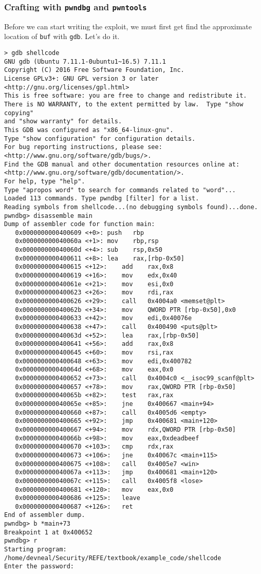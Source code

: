 \subsubsection{Crafting with \texttt{pwndbg} and \texttt{pwntools}}
Before we can start writing the exploit, we must first get find the approximate
location of \texttt{buf} with \texttt{gdb}. Let's do it.

\begin{lstlisting}
> gdb shellcode
GNU gdb (Ubuntu 7.11.1-0ubuntu1~16.5) 7.11.1
Copyright (C) 2016 Free Software Foundation, Inc.
License GPLv3+: GNU GPL version 3 or later <http://gnu.org/licenses/gpl.html>
This is free software: you are free to change and redistribute it.
There is NO WARRANTY, to the extent permitted by law.  Type "show copying"
and "show warranty" for details.
This GDB was configured as "x86_64-linux-gnu".
Type "show configuration" for configuration details.
For bug reporting instructions, please see:
<http://www.gnu.org/software/gdb/bugs/>.
Find the GDB manual and other documentation resources online at:
<http://www.gnu.org/software/gdb/documentation/>.
For help, type "help".
Type "apropos word" to search for commands related to "word"...
Loaded 113 commands. Type pwndbg [filter] for a list.
Reading symbols from shellcode...(no debugging symbols found)...done.
pwndbg> disassemble main
Dump of assembler code for function main:
   0x0000000000400609 <+0>:	push   rbp
   0x000000000040060a <+1>:	mov    rbp,rsp
   0x000000000040060d <+4>:	sub    rsp,0x50
   0x0000000000400611 <+8>:	lea    rax,[rbp-0x50]
   0x0000000000400615 <+12>:	add    rax,0x8
   0x0000000000400619 <+16>:	mov    edx,0x40
   0x000000000040061e <+21>:	mov    esi,0x0
   0x0000000000400623 <+26>:	mov    rdi,rax
   0x0000000000400626 <+29>:	call   0x4004a0 <memset@plt>
   0x000000000040062b <+34>:	mov    QWORD PTR [rbp-0x50],0x0
   0x0000000000400633 <+42>:	mov    edi,0x40076e
   0x0000000000400638 <+47>:	call   0x400490 <puts@plt>
   0x000000000040063d <+52>:	lea    rax,[rbp-0x50]
   0x0000000000400641 <+56>:	add    rax,0x8
   0x0000000000400645 <+60>:	mov    rsi,rax
   0x0000000000400648 <+63>:	mov    edi,0x400782
   0x000000000040064d <+68>:	mov    eax,0x0
   0x0000000000400652 <+73>:	call   0x4004c0 <__isoc99_scanf@plt>
   0x0000000000400657 <+78>:	mov    rax,QWORD PTR [rbp-0x50]
   0x000000000040065b <+82>:	test   rax,rax
   0x000000000040065e <+85>:	jne    0x400667 <main+94>
   0x0000000000400660 <+87>:	call   0x4005d6 <empty>
   0x0000000000400665 <+92>:	jmp    0x400681 <main+120>
   0x0000000000400667 <+94>:	mov    rdx,QWORD PTR [rbp-0x50]
   0x000000000040066b <+98>:	mov    eax,0xdeadbeef
   0x0000000000400670 <+103>:	cmp    rdx,rax
   0x0000000000400673 <+106>:	jne    0x40067c <main+115>
   0x0000000000400675 <+108>:	call   0x4005e7 <win>
   0x000000000040067a <+113>:	jmp    0x400681 <main+120>
   0x000000000040067c <+115>:	call   0x4005f8 <lose>
   0x0000000000400681 <+120>:	mov    eax,0x0
   0x0000000000400686 <+125>:	leave  
   0x0000000000400687 <+126>:	ret    
End of assembler dump.
pwndbg> b *main+73
Breakpoint 1 at 0x400652
pwndbg> r
Starting program: /home/devneal/Security/REFE/textbook/example_code/shellcode 
Enter the password:


\end{lstlisting}

